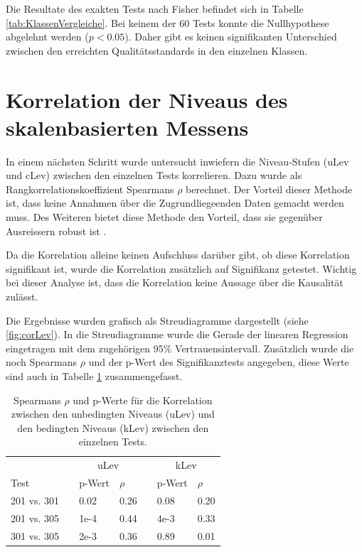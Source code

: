 Die Resultate des exakten Tests nach Fisher befindet sich in Tabelle \ref{tab:KlassenVergleiche}. Bei keinem der 60 Tests konnte die Nullhypothese abgelehnt werden ($p < 0.05$). Daher gibt es keinen signifikanten Unterschied zwischen den erreichten Qualitätsstandards in den einzelnen Klassen.  

\section{Korrelation der Niveaus des skalenbasierten Messens}

In einem nächsten Schritt wurde untersucht inwiefern die Niveau-Stufen (uLev und cLev) zwischen den einzelnen Tests korrelieren. Dazu wurde als Rangkorrelationskoeffizient Spearmans $\rho$ berechnet. Der Vorteil dieser Methode ist, dass keine Annahmen über die Zugrundliegeenden Daten gemacht werden muss. Des Weiteren bietet diese Methode den Vorteil, dass sie gegenüber Ausreissern robust ist \citep{Kowalski1972}. 

Da die Korrelation alleine keinen Aufschluss darüber gibt, ob diese Korrelation signifikant ist, wurde die Korrelation zusätzlich auf Signifikanz getestet. Wichtig bei dieser Analyse ist, dass die Korrelation keine Aussage über die Kausalität zulässt.


Die Ergebnisse wurden grafisch als Streudiagramme dargestellt (siehe \ref{fig:corLev}). In die Streudiagramme wurde die Gerade der linearen Regression eingetragen mit dem zugehörigen 95\% Vertrauensintervall. Zusätzlich wurde die noch Spearmans $\rho$ und der p-Wert des Signifikanztests angegeben, diese Werte sind auch in Tabelle \ref{tab:CorNiveau} zusammengefasst.



\begin{table}[htbp]
  \centering
\begin{tabular}{@{}lllllll@{}}
\toprule
 &&  \multicolumn{2}{c}{uLev} &&  \multicolumn{2}{c}{kLev}\\ 
 \cmidrule{3-4}  \cmidrule{6-7}
 Test && p-Wert & $\rho$ && p-Wert & $\rho$  \\ 
\midrule
 201 vs. 301 &&   0.02 & 0.26 && 0.08 & 0.20    \\ 
 201 vs. 305 &&   1e-4 & 0.44 && 4e-3 & 0.33      \\
 301 vs. 305 &&   2e-3 & 0.36 && 0.89 & 0.01    \\
\bottomrule
\end{tabular} 
  \caption{Spearmans $\rho$ und p-Werte für die Korrelation zwischen den unbedingten Niveaus (uLev) und den bedingten Niveaus (kLev) zwischen den einzelnen Tests.  }
  \label{tab:CorNiveau}
\end{table}
 
